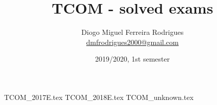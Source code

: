 \documentclass{tcom}
\title{TCOM - solved exams}
\author{Diogo Miguel Ferreira Rodrigues \\ \href{mailto:dmfrodrigues2000@gmail.com}{dmfrodrigues2000@gmail.com}}
\date{2019/2020, 1st semester}
\begin{document}
\begingroup
	\maketitle
	\let\clearpage\relax
	\setcounter{tocdepth}{2}
	\tableofcontents
\endgroup
{TCOM_2017E.tex}
{TCOM_2018E.tex}
{TCOM_unknown.tex}
\end{document}
